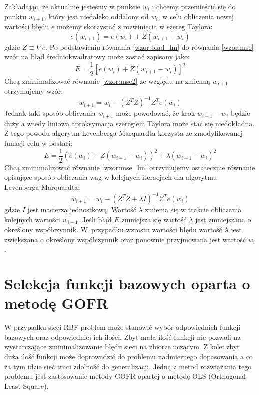 Zakładając, że aktualnie jesteśmy w punkcie $w_{i}$ i chcemy przemieścić się do punktu $w_{i+1}$, który jest niedaleko oddalony od $w_{i}$, w celu obliczenia nowej wartości błędu $e$ możemy skorzystać z rozwinięcia w szereg Taylora:
\begin{equation}
	\label{wzor:blad_lm}
	e(w_{i+1}) = e(w_{i}) + Z(w_{i+1} - w_{i})
\end{equation}
gdzie $Z \equiv \nabla e$. Po podstawieniu równania \eqref{wzor:blad_lm} do równania \eqref{wzor:mse} wzór na błąd średniokwadratowy może zostać zapisany jako:
\begin{equation}
	\label{wzor:mse2}
	E = \frac{1}{2}[e(w_{i}) + Z(w_{i+1} - w_{i})]^2
\end{equation}
Chcą zminimalizować równanie \eqref{wzor:mse2} ze względu na zmienną $w_{i+1}$ otrzymujemy wzór:
\begin{equation}
	w_{i+1} = w_{i} - (Z^TZ)^{-1}Z^Te(w_{i})
\end{equation}
Jednak taki sposób obliczania $w_{i+1}$ może powodować, że krok $w_{i+1} - w_{i}$ będzie duży a wtedy liniowa aproksymacja szeregiem Taylora może stać się niedokładna. Z tego powodu algorytm Levenberga-Marquardta korzysta ze zmodyfikowanej funkcji celu w postaci:
\begin{equation}
	\label{wzor:mse_lm}
	E = \frac{1}{2}(e(w_{i}) + Z(w_{i+1} - w_{i}))^2 + \lambda (w_{i+1} - w_{i})^2
\end{equation}
Chcą zminimalizować równanie \eqref{wzor:mse_lm} otrzymujemy ostatecznie równanie opisujące sposób obliczania wag w kolejnych iteracjach dla algorytmu Levenberga-Marquardta:
\begin{equation}
	w_{i+1} = w_{i} -(Z^TZ + \lambda I)^{-1}Z^Te(w_{i})
\end{equation}
gdzie $I$ jest macierzą jednostkową. Wartość $\lambda$ zmienia się w trakcie obliczania kolejnych wartości $w_{i+1}$. Jeśli błąd $E$ zmniejsza się wartość $\lambda$ jest zmniejszana o określony współczynnik. W~przypadku wzrostu wartości błędu wartość $\lambda$ jest zwiększana o określony współczynnik oraz ponownie przyjmowana jest wartość $w_i$.



\newpage
\section{Selekcja funkcji bazowych oparta o metodę GOFR}
W przypadku sieci RBF problem może stanowić wybór odpowiednich funkcji bazowych oraz odpowiedniej ich ilości. Zbyt mała ilość funkcji nie pozwoli na wystarczające zminimalizowanie błędu sieci na zbiorze uczącym. Z kolei zbyt duża ilość funkcji może doprowadzić do problemu nadmiernego dopasowania a co za tym idzie sieć traci zdolność do generalizacji. Jedną z metod rozwiązania tego problemu jest zastosowanie metody GOFR opartej o metodę OLS (Orthogonal Least Square). 

